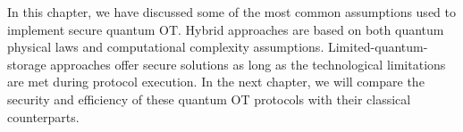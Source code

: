 In this chapter, we have discussed some of the most common assumptions used to implement secure quantum OT. Hybrid approaches are based on both quantum physical laws and computational complexity assumptions. Limited-quantum-storage approaches offer secure solutions as long as the technological limitations are met during protocol execution. In the next chapter, we will compare the security and efficiency of these quantum OT protocols with their classical counterparts.


%
%
%
